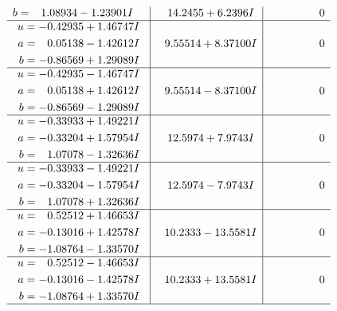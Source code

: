 \documentclass[1p]{elsarticle_modified}
\theoremstyle{definition}
\begin{document}
$$\begin{array}{c|c|c}
\begin{aligned}
b &= \phantom{-}1.08934 - 1.23901 I\end{aligned}
 & \phantom{-}14.2455 + 6.2396 I & \phantom{-0.000000 } 0 \\ \hline\begin{aligned}
u &= -0.42935 + 1.46747 I \\
a &= \phantom{-}0.05138 - 1.42612 I \\
b &= -0.86569 + 1.29089 I\end{aligned}
 & \phantom{-}9.55514 + 8.37100 I & \phantom{-0.000000 } 0 \\ \hline\begin{aligned}
u &= -0.42935 - 1.46747 I \\
a &= \phantom{-}0.05138 + 1.42612 I \\
b &= -0.86569 - 1.29089 I\end{aligned}
 & \phantom{-}9.55514 - 8.37100 I & \phantom{-0.000000 } 0 \\ \hline\begin{aligned}
u &= -0.33933 + 1.49221 I \\
a &= -0.33204 + 1.57954 I \\
b &= \phantom{-}1.07078 - 1.32636 I\end{aligned}
 & \phantom{-}12.5974 + 7.9743 I & \phantom{-0.000000 } 0 \\ \hline\begin{aligned}
u &= -0.33933 - 1.49221 I \\
a &= -0.33204 - 1.57954 I \\
b &= \phantom{-}1.07078 + 1.32636 I\end{aligned}
 & \phantom{-}12.5974 - 7.9743 I & \phantom{-0.000000 } 0 \\ \hline\begin{aligned}
u &= \phantom{-}0.52512 + 1.46653 I \\
a &= -0.13016 + 1.42578 I \\
b &= -1.08764 - 1.33570 I\end{aligned}
 & \phantom{-}10.2333 - 13.5581 I & \phantom{-0.000000 } 0 \\ \hline\begin{aligned}
u &= \phantom{-}0.52512 - 1.46653 I \\
a &= -0.13016 - 1.42578 I \\
b &= -1.08764 + 1.33570 I\end{aligned}
 & \phantom{-}10.2333 + 13.5581 I & \phantom{-0.000000 } 0\\
 \hline 
 \end{array}$$\newpage$$\begin{array}{c|c|c}  

\end{array}$$
\end{document}
